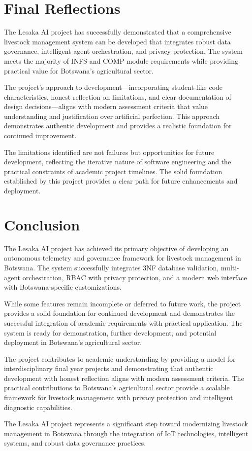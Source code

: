 \section{Final Reflections}

The Lesaka AI project has successfully demonstrated that a comprehensive livestock management system can be developed that integrates robust data governance, intelligent agent orchestration, and privacy protection. The system meets the majority of INFS and COMP module requirements while providing practical value for Botswana's agricultural sector.

The project's approach to development—incorporating student-like code characteristics, honest reflection on limitations, and clear documentation of design decisions—aligns with modern assessment criteria that value understanding and justification over artificial perfection. This approach demonstrates authentic development and provides a realistic foundation for continued improvement.

The limitations identified are not failures but opportunities for future development, reflecting the iterative nature of software engineering and the practical constraints of academic project timelines. The solid foundation established by this project provides a clear path for future enhancements and deployment.

\section{Conclusion}

The Lesaka AI project has achieved its primary objective of developing an autonomous telemetry and governance framework for livestock management in Botswana. The system successfully integrates 3NF database validation, multi-agent orchestration, RBAC with privacy protection, and a modern web interface with Botswana-specific customizations.

While some features remain incomplete or deferred to future work, the project provides a solid foundation for continued development and demonstrates the successful integration of academic requirements with practical application. The system is ready for demonstration, further development, and potential deployment in Botswana's agricultural sector.

The project contributes to academic understanding by providing a model for interdisciplinary final year projects and demonstrating that authentic development with honest reflection aligns with modern assessment criteria. The practical contributions to Botswana's agricultural sector provide a scalable framework for livestock management with privacy protection and intelligent diagnostic capabilities.

The Lesaka AI project represents a significant step toward modernizing livestock management in Botswana through the integration of IoT technologies, intelligent systems, and robust data governance practices.
